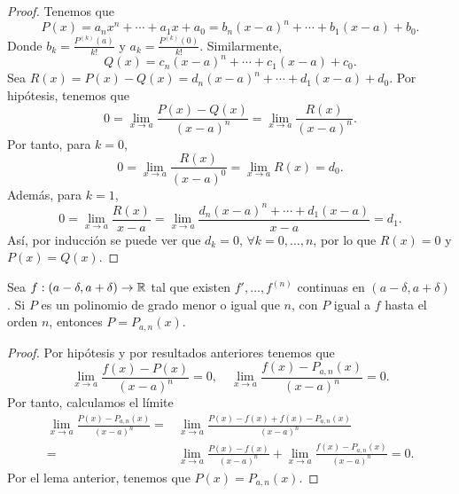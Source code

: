 \begin{proof}
Tenemos que 
\[P\left(x\right) = a_{n}x^{n} + \cdots + a_{1}x + a_{0} = b_{n}\left(x-a\right)^{n} + \cdots + b_{1}\left(x-a\right) + b_{0} .\]
Donde $\displaystyle b_{k} = \frac{P^{\left(k\right)}\left(a\right)}{k!} $ y $\displaystyle a_{k} = \frac{P^{\left(k\right)}\left(0\right)}{k!} $. Similarmente,
\[Q\left(x\right) = c_{n}\left(x-a\right)^{n} + \cdots + c_{1}\left(x-a\right) + c_{0} .\]
Sea $\displaystyle R\left(x\right) = P\left(x\right)-Q\left(x\right) = d _{n}\left(x-a\right)^{n} + \cdots + d _{1}\left(x-a\right) + d _{0} $. Por hipótesis, tenemos que
\[0 = \lim_{x \to a}\frac{P\left(x\right)-Q\left(x\right)}{\left(x-a\right)^{n}} = \lim_{x \to a}\frac{R\left(x\right)}{\left(x-a\right)^{n}} .\]
Por tanto, para $\displaystyle k= 0 $,
\[0 = \lim_{x \to a}\frac{R\left(x\right)}{\left(x-a\right)^{0}} = \lim_{x \to a}R\left(x\right) = d _{0} .\]
Además, para $\displaystyle k= 1 $,
\[0 = \lim_{x \to a} \frac{R\left(x\right)}{x-a} = \lim_{x \to a}\frac{d _{n}\left(x-a\right)^{n} + \cdots + d _{1}\left(x-a\right)}{x-a} = d _{1}.\]
Así, por inducción se puede ver que $\displaystyle d _{k} = 0 $, $\displaystyle \forall k= 0, \ldots, n $, por lo que $\displaystyle R\left(x\right)=0 $ y $\displaystyle P\left(x\right) = Q\left(x\right) $.
\end{proof}
\begin{ftheorem}[]
\normalfont Sea $\displaystyle f : \left(a -\delta, a + \delta \right)\to \mathbb{R} $ tal que existen $\displaystyle f', \ldots, f^{\left(n\right)} $ continuas en $\displaystyle \left(a-\delta, a + \delta \right) $. Si $\displaystyle P $ es un polinomio de grado menor o igual que $\displaystyle n $, con $\displaystyle P $ igual a $\displaystyle f $ hasta el orden $\displaystyle n $, entonces $\displaystyle P = P_{a,n}\left(x\right) $.
\end{ftheorem}
\begin{proof}
Por hipótesis y por resultados anteriores tenemos que 
\[\lim_{x \to a}\frac{f\left(x\right)-P\left(x\right)}{\left(x-a\right)^{n}} = 0, \quad \lim_{x \to a}\frac{f\left(x\right)-P_{a,n}\left(x\right)}{\left(x-a\right)^{n}} = 0 .\]
Por tanto, calculamos el límite
\[
\begin{split}
	\lim_{x \to a}\frac{P\left(x\right)-P_{a,n}\left(x\right)}{\left(x-a\right)^{n}} = & \lim_{x \to a}\frac{P\left(x\right)-f\left(x\right) + f\left(x\right)-P_{a,n}\left(x\right)}{\left(x-a\right)^{n}} \\
	= &  \lim_{x \to a}\frac{P\left(x\right)-f\left(x\right)}{\left(x-a\right)^{n}} + \lim_{x \to a}\frac{f\left(x\right)-P_{a,n}\left(x\right)}{\left(x-a\right)^{n}} = 0 .
\end{split}
\]
Por el lema anterior, tenemos que $\displaystyle P\left(x\right) = P_{a,n}\left(x\right) $.
\end{proof}

